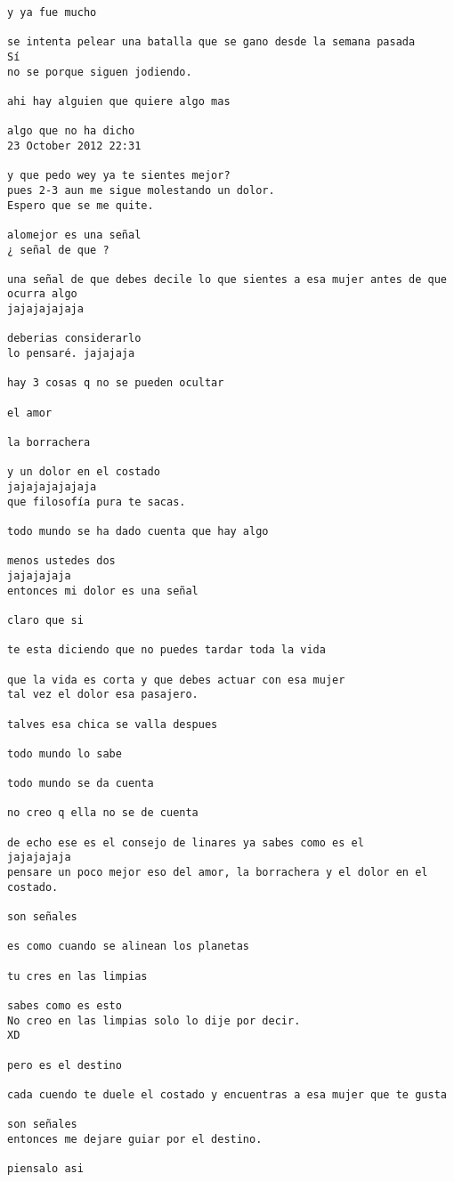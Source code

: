 \begin{verbatim}
y ya fue mucho

se intenta pelear una batalla que se gano desde la semana pasada
Sí
no se porque siguen jodiendo.

ahi hay alguien que quiere algo mas

algo que no ha dicho
23 October 2012 22:31

y que pedo wey ya te sientes mejor?
pues 2-3 aun me sigue molestando un dolor.
Espero que se me quite.

alomejor es una señal
¿ señal de que ?

una señal de que debes decile lo que sientes a esa mujer antes de que ocurra algo
jajajajajaja

deberias considerarlo
lo pensaré. jajajaja

hay 3 cosas q no se pueden ocultar

el amor

la borrachera

y un dolor en el costado
jajajajajajaja
que filosofía pura te sacas.

todo mundo se ha dado cuenta que hay algo

menos ustedes dos
jajajajaja
entonces mi dolor es una señal

claro que si

te esta diciendo que no puedes tardar toda la vida

que la vida es corta y que debes actuar con esa mujer
tal vez el dolor esa pasajero.

talves esa chica se valla despues

todo mundo lo sabe

todo mundo se da cuenta

no creo q ella no se de cuenta

de echo ese es el consejo de linares ya sabes como es el
jajajajaja
pensare un poco mejor eso del amor, la borrachera y el dolor en el costado.

son señales

es como cuando se alinean los planetas

tu cres en las limpias

sabes como es esto
No creo en las limpias solo lo dije por decir.
XD

pero es el destino

cada cuendo te duele el costado y encuentras a esa mujer que te gusta

son señales
entonces me dejare guiar por el destino.

piensalo asi


\end{verbatim}
